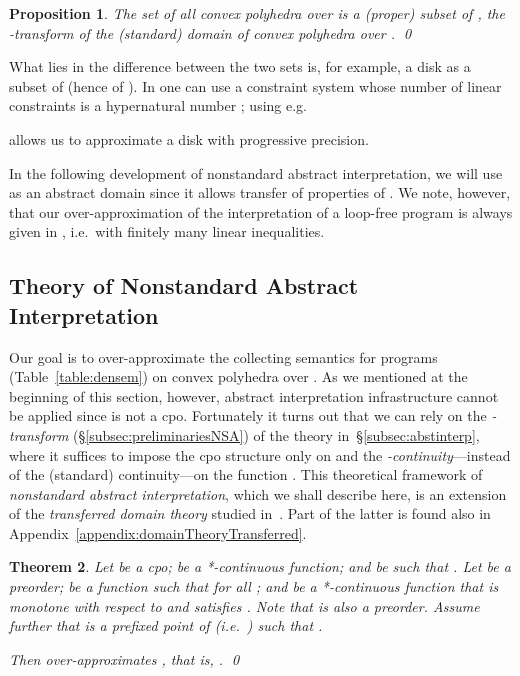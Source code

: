 \documentclass[envcountsect,orivec]{llncs} \pdfoutput=1
\newtheorem{mythm}{Theorem}[section]
\newtheorem{myprop}[mythm]{Proposition}
\theoremstyle{definition}
\def\myqed{\qed}
\begin{document}
\begin{myprop}\label{prop:hyperconvexpoly}
The set  of all  convex  polyhedra over 
is a (proper) subset of
, the -transform of the (standard) domain of convex polyhedra over .
\myqed
\end{myprop}
What lies in the difference between the two sets
 is, for example, a disk as a
subset of  (hence of ). In  one can use a constraint system whose number of linear constraints is a hypernatural number ; using e.g.\

allows us to approximate a disk with progressive precision.

In the following development of nonstandard abstract interpretation,  we
will use  as an abstract domain since it allows transfer
of properties of .
 We note, however, that 
our over-approximation of
the interpretation  of a loop-free  program  
is always given in , i.e.\ with finitely many linear inequalities.




\subsection{Theory of Nonstandard Abstract Interpretation}
\label{subsec:theoryOfHyperAbstractInterp}


Our goal is to over-approximate the collecting semantics for  programs (Table~\ref{table:densem}) on convex polyhedra over .
As we mentioned at the beginning of this section, however, abstract interpretation infrastructure cannot be applied since  is not a cpo.
Fortunately it turns out that we can rely on the \emph{-transform}
(\S{}\ref{subsec:preliminariesNSA}) of
the theory in~\S{}\ref{subsec:abstinterp}, where it suffices to impose the cpo structure only on  and the \emph{-continuity}---instead of the (standard)
continuity---on
the function
 .
 This theoretical framework of \emph{nonstandard abstract
 interpretation}, which we shall describe here, is an extension of the
 \emph{transferred domain theory} studied
 in~\cite{BeauxisM11,Suenaga2013}. Part of the latter is found also in Appendix~\ref{appendix:domainTheoryTransferred}.













\begin{mythm}\label{thm:hyperconcretization}
Let  be a cpo;
  be a *-continuous function;
 and  be such that .
Let  be a preorder;
  be a function such that  for all ; and
  be a *-continuous function that is monotone with respect to  and satisfies .
Note that  is also a preorder.
Assume further that   is a prefixed point of   
 (i.e.\ )
 such that .

Then  over-approximates , that is,
.
\myqed
\end{mythm}
\end{document}
